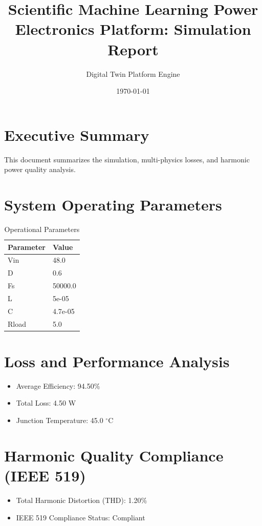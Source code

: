 \documentclass{article}
\title{Scientific Machine Learning Power Electronics Platform: Simulation Report}
\author{Digital Twin Platform Engine}
\date{\today}
\begin{document}
\maketitle

\section{Executive Summary}
This document summarizes the simulation, multi-physics losses, and harmonic power quality analysis. 

\section{System Operating Parameters}
\begin{table}[ht]
\centering
\caption{Operational Parameters}
\begin{tabular}{ll}
\toprule
Parameter & Value \\
\midrule
Vin & 48.0 \\
D & 0.6 \\
Fs & 50000.0 \\
L & 5e-05 \\
C & 4.7e-05 \\
Rload & 5.0 \\
\bottomrule
\end{tabular}
\end{table}

\section{Loss and Performance Analysis}
\begin{itemize}
\item Average Efficiency: 94.50\%
\item Total Loss: 4.50 W
\item Junction Temperature: 45.0 $^\circ$C
\end{itemize}

\section{Harmonic Quality Compliance (IEEE 519)}
\begin{itemize}
\item Total Harmonic Distortion (THD): 1.20\%
\item IEEE 519 Compliance Status: Compliant
\end{itemize}
\end{document}
